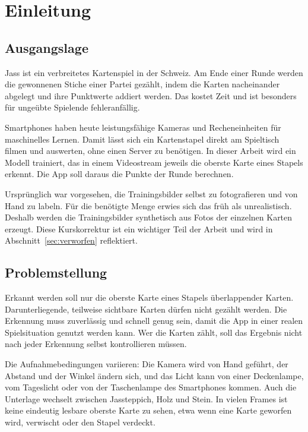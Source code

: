 \section{Einleitung}\label{sec:einleitung}

\subsection{Ausgangslage}\label{sec:ausgangslage}

Jass ist ein verbreitetes Kartenspiel in der Schweiz. Am Ende einer Runde
werden die gewonnenen Stiche einer Partei gezählt, indem die Karten
nacheinander abgelegt und ihre Punktwerte addiert werden. Das kostet Zeit
und ist besonders für ungeübte Spielende fehleranfällig.

Smartphones haben heute leistungsfähige Kameras und Recheneinheiten für
maschinelles Lernen. Damit lässt sich ein Kartenstapel direkt am Spieltisch
filmen und auswerten, ohne einen Server zu benötigen. In dieser Arbeit wird
ein Modell trainiert, das in einem Videostream jeweils die oberste Karte
eines Stapels erkennt. Die App soll daraus die Punkte der Runde berechnen.

Ursprünglich war vorgesehen, die Trainingsbilder selbst zu fotografieren
und von Hand zu labeln. Für die benötigte Menge erwies sich das früh als
unrealistisch. Deshalb werden die Trainingsbilder synthetisch aus Fotos der
einzelnen Karten erzeugt. Diese Kurskorrektur ist ein wichtiger Teil der
Arbeit und wird in Abschnitt~\ref{sec:verworfen} reflektiert.

\subsection{Problemstellung}\label{sec:problemstellung}

Erkannt werden soll nur die oberste Karte eines Stapels überlappender
Karten. Darunterliegende, teilweise sichtbare Karten dürfen nicht gezählt
werden. Die Erkennung muss zuverlässig und schnell genug sein, damit die
App in einer realen Spielsituation genutzt werden kann. Wer die Karten
zählt, soll das Ergebnis nicht nach jeder Erkennung selbst kontrollieren
müssen.

Die Aufnahmebedingungen variieren: Die Kamera wird von Hand geführt, der
Abstand und der Winkel ändern sich, und das Licht kann von einer
Deckenlampe, vom Tageslicht oder von der Taschenlampe des Smartphones
kommen. Auch die Unterlage wechselt zwischen Jassteppich, Holz und Stein.
In vielen Frames ist keine eindeutig lesbare oberste Karte zu sehen, etwa
wenn eine Karte geworfen wird, verwischt oder den Stapel verdeckt.

